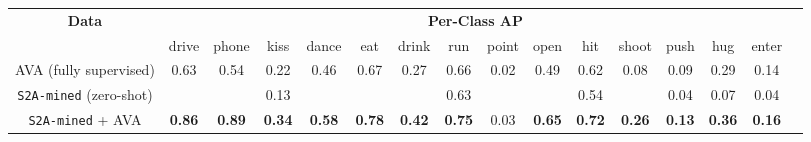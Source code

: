 
\centering 
\begin{footnotesize}
\begin{tabular}{c c c c c c c c c c c c c c c c} 
\toprule
\multicolumn{1}{c}{\textbf{Data}}&
\multicolumn{14}{c}{\textbf{Per-Class AP}}  \\
                              & drive & phone & kiss & dance & eat & drink & run & point & open & hit & shoot & push & hug & enter \\ 
\midrule
AVA \tiny{(fully supervised)} & 0.63  & 0.54  & 0.22 & 0.46  &0.67 & 0.27  & 0.66 & 0.02 & 0.49 & 0.62 & 0.08 & 0.09 & 0.29 &0.14 \\
\midrule
 \texttt{S2A-mined} \tiny{(zero-shot)} & \cellcolor{mistyrose}{0.83} & \cellcolor{mistyrose}{0.79} & 0.13 & \cellcolor{mistyrose}{0.55} & \cellcolor{mistyrose}{0.68} & \cellcolor{mistyrose}{0.30} & 0.63 &  \cellcolor{mistyrose}{0.04}& \cellcolor{mistyrose}{0.52} & 0.54 & \cellcolor{mistyrose}{0.18} & 0.04 & 0.07 & 0.04\\
\midrule
\texttt{S2A-mined} + AVA & \textbf{0.86} & \textbf{0.89} & \textbf{0.34} & \textbf{0.58} & \textbf{0.78} & \textbf{0.42} & \textbf{0.75} & 0.03 & \textbf{0.65} & \textbf{0.72} & \textbf{0.26} & \textbf{0.13} & \textbf{0.36} & \textbf{0.16}\\
 \bottomrule
\end{tabular}
\end{footnotesize}
